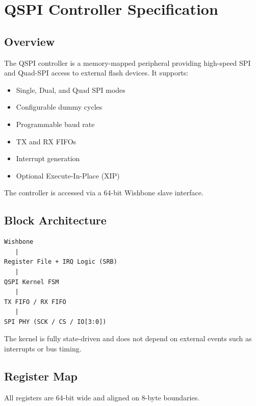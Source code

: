 \section{QSPI Controller Specification}

\subsection{Overview}

The QSPI controller is a memory-mapped peripheral providing high-speed
SPI and Quad-SPI access to external flash devices.
It supports:

\begin{itemize}
  \item Single, Dual, and Quad SPI modes
  \item Configurable dummy cycles
  \item Programmable baud rate
  \item TX and RX FIFOs
  \item Interrupt generation
  \item Optional Execute-In-Place (XIP)
\end{itemize}

The controller is accessed via a 64-bit Wishbone slave interface.

\subsection{Block Architecture}

\begin{verbatim}
Wishbone
   |
Register File + IRQ Logic (SRB)
   |
QSPI Kernel FSM
   |
TX FIFO / RX FIFO
   |
SPI PHY (SCK / CS / IO[3:0])
\end{verbatim}

The kernel is fully state-driven and does not depend on external events
such as interrupts or bus timing.

\subsection{Register Map}

All registers are 64-bit wide and aligned on 8-byte boundaries.

